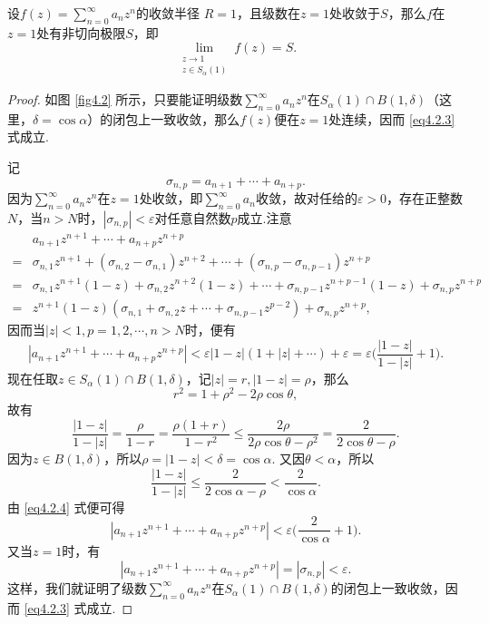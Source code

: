 \begin{theorem}\label{thm4.2.9}
  设$f(z)=\sum_{n=0}^\infty a_nz^n$的收敛半径
  $R=1$，且级数在$z=1$处收敛于$S$，那么$f$在$z=1$处有非切向极限$S$，即
  \begin{equation}\label{eq4.2.3}
    \lim_{\substack{z\to1\\z\in S_\alpha(1)}}f(z)=S.
  \end{equation}
\end{theorem}
\begin{proof}
  如图 \ref{fig4.2} 所示，只要能证明级数$\sum_{n=0}^\infty a_nz^n$在$S_\alpha(1)\cap B(1,\delta)$（这里，$\delta=\cos\alpha$）的闭包上一致收敛，那么$f(z)$便在$z=1$处连续，因而 \eqref{eq4.2.3} 式成立.

  记
  \[
    \sigma_{n,p} = a_{n+1} + \cdots + a_{n+p}.
  \]
  因为$\sum_{n=0}^\infty a_nz^n$在$z=1$处收敛，即$\sum_{n=0}^\infty a_n$收敛，故对任给的$\varepsilon>0$，存在正整数$N$，当$n>N$时，$|\sigma_{n,p}|<\varepsilon$对任意自然数$p$成立.注意
  \begin{align*}
    & a_{n+1}z^{n+1} + \cdots + a_{n+p}z^{n+p}\\
    = {} & \sigma_{n,1}z^{n+1} +
    (\sigma_{n,2} - \sigma_{n,1})z^{n+2} + \cdots + (\sigma_{n,p} - \sigma_{n,p-1})z^{n+p}\\
    = {} & \sigma_{n,1}z^{n+1}(1-z) + \sigma_{n,2}z^{n+2}(1-z) + \cdots + \sigma_{n,p-1}z^{n+p-1}(1-z)
    + \sigma_{n,p}z^{n+p}\\
    = {} & z^{n+1}(1-z)(\sigma_{n,1}
      + \sigma_{n,2}z + \cdots + \sigma_{n,p-1}z^{p-2}) + \sigma_{n,p}z^{n+p},
  \end{align*}
  因而当$|z|<1,p=1,2,\cdots,n>N$时，便有
  \begin{equation}\label{eq4.2.4}
    |a_{n+1}z^{n+1} +\cdots + a_{n+p}z^{n+p}| <\varepsilon|1 - z|(1 + |z| + \cdots) + \varepsilon
    =\varepsilon\bigg(\frac{|1 - z|}{1 - |z|} + 1\bigg).
  \end{equation}
  现在任取$z\in S_\alpha(1)\cap B(1,\delta)$，记$|z|=r,|1-z|=\rho$，那么
  \[
    r^2 = 1 + \rho^2 - 2\rho\cos\theta,
  \]
  故有
  \[
     \frac{|1-z|}{1-|z|} = \frac\rho{1-r} = \frac{\rho(1+r)}{1-r^2} \le
    \frac{2\rho}{2\rho\cos\theta-\rho^2} = \frac2{2\cos\theta-\rho}.
  \]
  因为$z\in B(1,\delta)$，所以$\rho=|1-z|<\delta=\cos\alpha$. 又因$\theta<\alpha$，所以
  \[
    \frac{|1-z|}{1-|z|} \le \frac2{2\cos\alpha-\rho} < \frac2{\cos\alpha}.
  \]
  由 \eqref{eq4.2.4} 式便可得
  \[
    |a_{n+1}z^{n+1} + \cdots+a_{n+p}z^{n+p}| < \varepsilon \bigg( \frac2{\cos\alpha} + 1 \bigg).
  \]
  又当$z=1$时，有
  \[
    |a_{n+1}z^{n+1} + \cdots + a_{n+p}z^{n+p}| = |\sigma_{n,p}| < \varepsilon.
  \]
  这样，我们就证明了级数$\sum_{n=0}^\infty a_nz^n$在$S_\alpha(1)\cap B(1,\delta)$的闭包上一致收敛，因而 \eqref{eq4.2.3} 式成立.
\end{proof}

